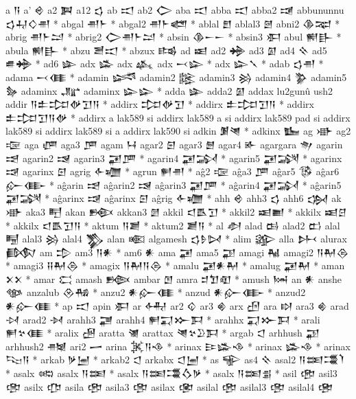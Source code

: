  a  𒀀   
 a'  𒄴   
 a2  𒀉   
 a12  𒌓   
 ab  𒀊   
 ab2  𒀖   
 aba  𒀊   
 abba  𒀊   
 abba2  𒀋   
 abbununnu  𒌓𒄷𒄭𒉣 *   
 abgal  𒉣𒈨 *   
 abgal2  𒉣𒈨𒅤 *   
 ablal  𒆼   
 ablal3  𒇦   
 abni2  𒆠𒉈 *   
 abrig  𒉣𒈨𒁺 *   
 abrig2  𒀖𒉣𒈨𒁺 *   
 absin  𒆠𒀸𒀸 *   
 absin3  𒀳   
 abul  𒆍𒃲 *   
 abula  𒆍𒃲 *   
 abzu  𒍪𒀊 *   
 abzux  𒌤   
 ad  𒀜   
 ad2  𒄉   
 ad3  𒇼   
 ad4  𒍞   
 ad5  𒌑𒄉 *   
 ad6  𒇿   
 adx  𒈕   
 adx  𒎉   
 adx  𒁁𒇽 *   
 adx  𒇽𒃵   *   
 adab  𒌓𒉣 *   
 adama  𒁁𒈪 *   
 adamin  𒈓   
 adamin2  𒈘   
 adamin3  𒄒   
 adamin4  𒉫   
 adamin5  𒂛   
 adaminx  𒂜   
 adaminx  𒇽𒇽 *   
 adda  𒇿   
 adda2  𒇼   
 addax  lu2gunû ush2  
 addir  𒀀𒉺𒄐𒉻𒋛𒀀 *   
 addirx  𒄐𒉻𒋛 *   
 addirx  𒉺𒄐𒋛𒀀 *   
 addirx  𒉺𒄐𒋛𒀀𒉻 *   
 addirx  a lak589 si   
 addirx  lak589 a si   
 addirx  lak589 pad si   
 addirx  lak589 si   
 addirx  lak589 si a   
 addirx  lak590 si   
 adkin  𒋠𒇴 *   
 adkinx  𒋁   
 ag  𒀝   
 ag2  𒉘   
 aga  𒂇   
 aga3  𒂆   
 agam  𒀂   
 agar2  𒇋   
 agar3  𒆻   
 agar4  𒅊   
 agargara  𒉩   
 agarin  𒀌   
 agarin2  𒀎   
 agarin3  𒂼𒂆 *   
 agarin4  𒂼𒋆 *   
 agarin5  𒂼𒋋 *   
 agarinx  𒀏   
 agarinx  𒇉   
 agrig  𒅆𒁾 *   
 agrun  𒂍𒉣 *   
 aĝ2  𒉘   
 aĝa3  𒂆   
 aĝar5  𒅐   
 aĝar6  𒅎𒂂 *   
 aĝarin  𒀌   
 aĝarin2  𒀎   
 aĝarin3  𒂼𒂆 *   
 aĝarin4  𒂼𒋆 *   
 aĝarin5  𒂼𒋋 *   
 aĝarinx  𒀏   
 aĝarinx  𒇉   
 aĝrig  𒅆𒁾 *   
 ahh  𒄴   
 ahh3  𒌓   
 ahh6  𒌔   
 ak  𒀝   
 aka3  𒋃   
 akan  𒁛   
 akkan3  𒇖   
 akkil  𒃰𒋺𒋛 *   
 akkil2  𒀜𒆤 *   
 akkilx  𒀜𒆪 *   
 akkilx  𒃰𒋺𒋛𒀀 *   
 aktum  𒀀𒋢 *   
 aktum2  𒋢𒀀 *   
 al  𒀠   
 alad  𒆘   
 alad2  𒆗   
 alal  𒋄   
 alal3  𒄒   
 alal4  𒃺   
 alan  𒀩   
 algamesh  𒌓𒊩𒄸 *   
 alim  𒄋   
 alla  𒉄   
 alurax  𒁃   
 am  𒄠   
 am3  𒀀𒀭 *   
 am6  𒀭   
 ama  𒂼   
 ama5  𒃣   
 amagi  𒈻   
 amagi2  𒀀𒈹𒁲 *   
 amagi3  𒍝𒈹𒁲 *   
 amagix  𒀀𒈹𒀀𒁲 *   
 amalu  𒂼𒀭𒈹 *   
 amalug  𒂼𒈹 *   
 aman  𒉽𒉽 *   
 amar  𒀫   
 amash  𒁦   
 ambar  𒆹   
 amra  𒄑𒈣𒊏 *   
 amush  𒀇   
 an  𒀭   
 anshe  𒀲   
 anzalub  𒊮𒄀 *   
 anzu2  𒀭𒅎𒈪 *   
 anzud  𒀭𒅎𒂂 *   
 anzud2  𒀭𒅎𒈪 *   
 ap  𒀊   
 apin  𒀳   
 ar  𒅈   
 ar2  𒄱   
 ar3  𒄯   
 arx  𒌸   
 ara  𒊭   
 ara3  𒄯   
 arad  𒀴   
 arad2  𒀵   
 arahh3  𒃥   
 arahh4  𒂍𒍑𒁍𒁕 *   
 arahhx  𒍑𒁍𒁕 *   
 arali  𒂍𒆳𒈪 *   
 aralix  𒌽   
 aratta  𒇶   
 arattax  𒇴𒆳𒊒𒁕 *   
 argab  𒀶   
 arhhush  𒃣   
 arhhush2  𒉦   
 ari2  𒅂   
 arina  𒈸𒀀𒈾 *   
 arinax  𒄿𒈕𒈾 *   
 arinax  𒈕𒈾 *   
 arinax  𒌫𒀀 *   
 arkab  𒃻𒅁 *   
 arkab2  𒀶   
 arkabx  𒀶𒅁 *   
 as  𒊍   
 as4  𒍞   
 asal2  𒀀𒌅𒃮𒇺 *   
 asalx  𒀷   
 asalx  𒀀𒌅 *   
 asalx  𒀀𒌅𒃮𒋝𒃻 *   
 asalx  𒀀𒌅𒉪 *   
 asil  𒂰   
 asil3  𒂢   
 asilx  𒂡   
 asila  𒂰   
 asila3  𒂢   
 asilax  𒂬   
 asilal  𒂰   
 asilal3  𒂢   
 asilal4  𒂤   
